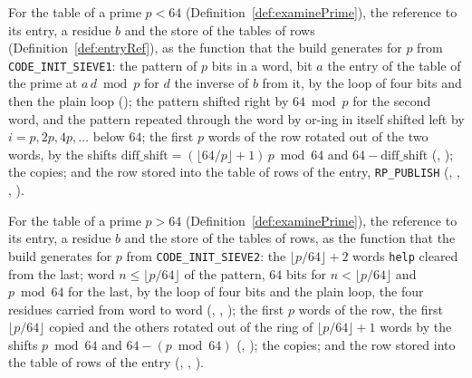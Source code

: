 \begin{definition}\label{def:sieveInit1}
  \leanok
  For the table of a prime $p < 64$ (Definition~\ref{def:examinePrime}), the reference to its entry,
  a residue $b$ and the store of the tables of rows (Definition~\ref{def:entryRef}), as the function
  that the build generates for $p$ from \verb|CODE_INIT_SIEVE1|: the pattern of $p$ bits in a word,
  bit $a$ the entry of the table of the prime at $a\, d \bmod p$ for $d$ the inverse of $b$ from it,
  by the loop of four bits and then the plain loop (); the pattern shifted
  right by $64 \bmod p$ for the second word, and the pattern repeated through the word by or-ing in
  itself shifted left by $i = p, 2p, 4p, \dots$ below $64$; the first $p$ words of the row rotated
  out of the two words, by the shifts
  $\mathrm{diff\_shift} = (\lfloor 64/p \rfloor + 1)\, p \bmod 64$ and $64 - \mathrm{diff\_shift}$
  (, ); the copies; and the row stored into the
  table of rows of the entry, \verb|RP_PUBLISH| (,
  , , ).
\end{definition}

\begin{definition}\label{def:sieveInit2}
  \leanok
  For the table of a prime $p > 64$ (Definition~\ref{def:examinePrime}), the reference to its entry,
  a residue $b$ and the store of the tables of rows, as the function that the build generates for
  $p$ from \verb|CODE_INIT_SIEVE2|: the $\lfloor p/64 \rfloor + 2$ words \verb|help| cleared from
  the last; word $n \le \lfloor p/64 \rfloor$ of the pattern, $64$ bits for
  $n < \lfloor p/64 \rfloor$ and $p \bmod 64$ for the last, by the loop of four bits and the plain
  loop, the four residues carried from word to word (,
  , ); the first $p$ words of the row, the first
  $\lfloor p/64 \rfloor$ copied and the others rotated out of the ring of $\lfloor p/64 \rfloor + 1$
  words by the shifts $p \bmod 64$ and $64 - (p \bmod 64)$ (,
  ); the copies; and the row stored into the table of rows of the entry
  (, , ).
\end{definition}

